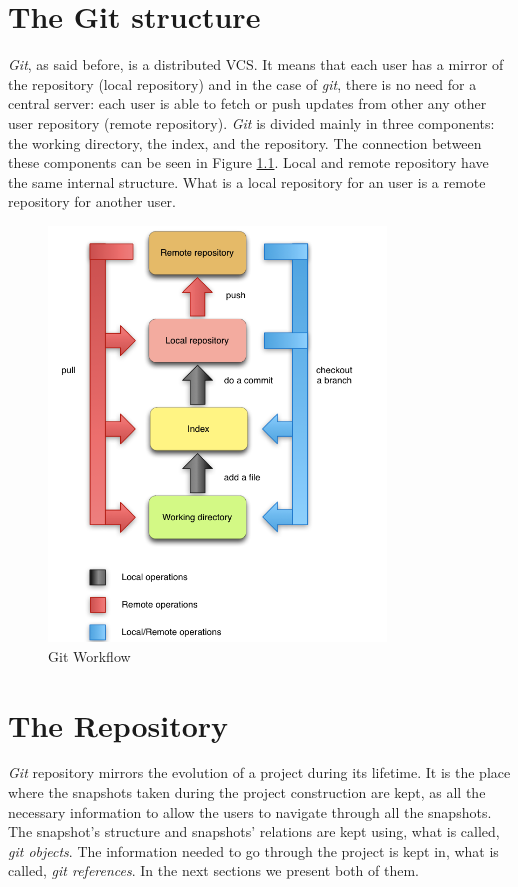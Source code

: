 \chapter{The Git structure}
\emph{Git}, as said before, is a distributed VCS.
It means that each user has a mirror of the repository (local
repository) and in the case of
\emph{git}, there is no need for a central server: each user is able to
fetch or push updates from other any other user repository (remote repository).
\emph{Git} is divided mainly in three components: the working directory,
the index, and the repository. The connection between these components
can be seen in Figure \ref{fig:git_structure}. Local and remote
repository have the same internal structure. What is a local
repository for an user is a remote repository for another user.

\begin{figure}[b]
   \centering
   \includegraphics[width=0.8\textwidth]{images/git_workflow.png}
   \caption{Git Workflow}\label{fig:git_structure}
\end{figure}

\pagebreak

\chapter{The Repository}
\emph{Git} repository mirrors the evolution of a project during its lifetime. It is
the place where the snapshots taken during the project construction
are kept, as all the necessary information to
allow the users to navigate through all the snapshots. The snapshot's
structure and snapshots' relations are kept using, what is called, \emph{git
objects}. The information needed to go through the project is kept in,
what is called, \emph{git references}. In the next sections we
present both of them.


